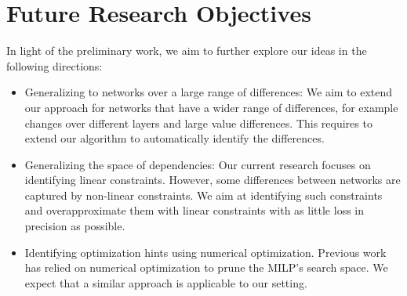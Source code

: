 

\section{Future Research Objectives}
In light of the preliminary work, we aim to further explore our ideas in the following directions:
\begin{itemize}
    \item Generalizing to networks over a large range of differences: We aim to extend our approach for networks that have a wider range of differences, for example changes over different layers and large value differences. This requires to extend our algorithm to automatically identify the differences.
    \item Generalizing the space of dependencies: Our current research focuses on identifying linear constraints. However, some differences between networks are captured by non-linear constraints. We aim at identifying such constraints and overapproximate them with linear constraints with as little loss in precision as possible. %
    \item Identifying optimization hints using numerical optimization. Previous work~\cite{VHAGAR} has relied on numerical optimization to prune the MILP's search space. We expect that a similar approach is applicable to our setting. %
\end{itemize}
